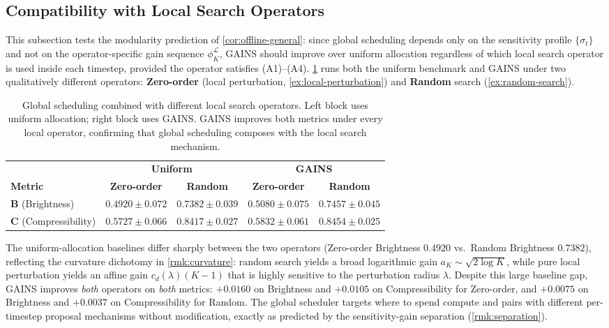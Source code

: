 \subsection{Compatibility with Local Search Operators}
\label{sec:appendix-operator-compat}
%
This subsection tests the modularity prediction of \cref{cor:offline-general}: since global scheduling depends only on the sensitivity profile $\{\sigma_t\}$ and not on the operator-specific gain sequence $\phi_K^{\mathcal{L}}$, \textsc{GAINS} should improve over uniform allocation regardless of which local search operator is used inside each timestep, provided the operator satisfies (A1)--(A4). \cref{tab:local_search_combo} runs both the uniform benchmark and \textsc{GAINS} under two qualitatively different operators: \textbf{Zero-order} (local perturbation, \cref{ex:local-perturbation}) and \textbf{Random} search (\cref{ex:random-search}).

\begin{table}[h]
\centering
\caption{Global scheduling combined with different local search operators. Left block uses uniform allocation; right block uses \textsc{GAINS}. \textsc{GAINS} improves both metrics under every local operator, confirming that global scheduling composes with the local search mechanism.}
\label{tab:local_search_combo}
\small
\begin{tabular}{lcccc}
\toprule
& \multicolumn{2}{c}{\textbf{Uniform}} & \multicolumn{2}{c}{\textbf{GAINS}} \\
\cmidrule(lr){2-3} \cmidrule(lr){4-5}
\textbf{Metric} & \textbf{Zero-order} & \textbf{Random} & \textbf{Zero-order} & \textbf{Random} \\
\midrule
\textbf{B} (Brightness) & $0.4920\pm0.072$ & $0.7382\pm0.039$ & $\mathbf{0.5080\pm0.075}$ & $\mathbf{0.7457\pm0.045}$ \\
\textbf{C} (Compressibility) & $0.5727\pm0.066$ & $0.8417\pm0.027$ & $\mathbf{0.5832\pm0.061}$ & $\mathbf{0.8454\pm0.025}$ \\
\bottomrule
\end{tabular}
\end{table}

The uniform-allocation baselines differ sharply between the two operators (Zero-order Brightness $0.4920$ vs.\ Random Brightness $0.7382$), reflecting the curvature dichotomy in \cref{rmk:curvature}: random search yields a broad logarithmic gain $a_K \sim \sqrt{2\log K}$, while pure local perturbation yields an affine gain $c_d(\lambda)(K-1)$ that is highly sensitive to the perturbation radius $\lambda$. Despite this large baseline gap, \textsc{GAINS} improves \emph{both} operators on \emph{both} metrics: $+0.0160$ on Brightness and $+0.0105$ on Compressibility for Zero-order, and $+0.0075$ on Brightness and $+0.0037$ on Compressibility for Random. The global scheduler targets where to spend compute and pairs with different per-timestep proposal mechanisms without modification, exactly as predicted by the sensitivity-gain separation (\cref{rmk:separation}).

